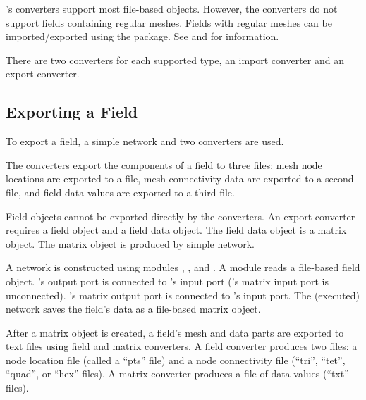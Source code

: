 
\sr{}'s converters support most \sr{} file-based objects.  However,
the converters do not support fields containing regular meshes.
Fields with regular meshes can be imported/exported using the
 package.  See  and
for information.

There are two converters for each supported \sr{} type, an import
converter and an export converter.

\subsection{Exporting a Field}
\label{sec:export_field}

To export a field, a simple \sci{} network and two converters are used.

The converters export the components of a field to three files: mesh
node locations are exported to a file, mesh connectivity data are
exported to a second file, and field data values are exported to a
third file.

Field objects cannot be exported directly by the converters.  An
export converter requires a field object and a field data object.  The
field data object is a \sr{} matrix object. The matrix object is
produced by simple \sr{} network.

A network is constructed using modules ,
, and .  A
 module reads a file-based field object.
's output port is connected to
's input port ('s
matrix input port is unconnected).  's
matrix output port is connected to 's input
port.  The (executed) network saves the field's data as a file-based
matrix object.

After a matrix object is created, a field's mesh and data parts are
exported to text files using field and matrix converters.  A field
converter produces two files: a node location file (called a ``pts''
file) and a node connectivity file (``tri'', ``tet'', ``quad'', or
``hex'' files).  A matrix converter produces a file of data values
(``txt'' files).


